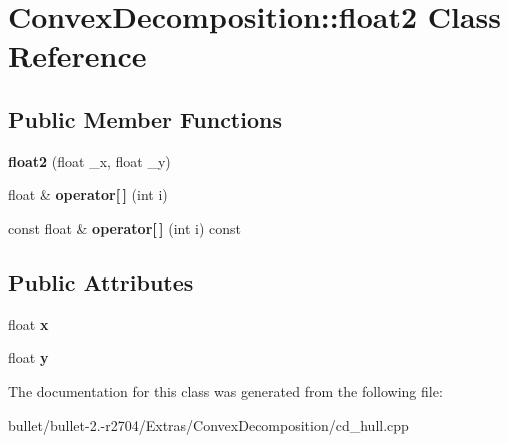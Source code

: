 \hypertarget{class_convex_decomposition_1_1float2}{\section{Convex\+Decomposition\+:\+:float2 Class Reference}
\label{class_convex_decomposition_1_1float2}
}
\subsection*{Public Member Functions}
\begin{DoxyCompactItemize}
\item 
\hypertarget{class_convex_decomposition_1_1float2_a3aa00acc282692db6dd2f2e792128a7e}{{\bfseries float2} (float \+\_\+x, float \+\_\+y)}\label{class_convex_decomposition_1_1float2_a3aa00acc282692db6dd2f2e792128a7e}

\item 
\hypertarget{class_convex_decomposition_1_1float2_a8a2a663a38f8d0798ff24c2ceda067d3}{float \& {\bfseries operator\mbox{[}$\,$\mbox{]}} (int i)}\label{class_convex_decomposition_1_1float2_a8a2a663a38f8d0798ff24c2ceda067d3}

\item 
\hypertarget{class_convex_decomposition_1_1float2_a0901c57ef39d93808e87cfff5314fcf2}{const float \& {\bfseries operator\mbox{[}$\,$\mbox{]}} (int i) const }\label{class_convex_decomposition_1_1float2_a0901c57ef39d93808e87cfff5314fcf2}

\end{DoxyCompactItemize}
\subsection*{Public Attributes}
\begin{DoxyCompactItemize}
\item 
\hypertarget{class_convex_decomposition_1_1float2_a6b88d751fa5b9f3bbbbc594ac6edfac0}{float {\bfseries x}}\label{class_convex_decomposition_1_1float2_a6b88d751fa5b9f3bbbbc594ac6edfac0}

\item 
\hypertarget{class_convex_decomposition_1_1float2_a7e1156917bcac4bed8291e4163de84ee}{float {\bfseries y}}\label{class_convex_decomposition_1_1float2_a7e1156917bcac4bed8291e4163de84ee}

\end{DoxyCompactItemize}


The documentation for this class was generated from the following file\+:\begin{DoxyCompactItemize}
\item 
bullet/bullet-\/2.-\/r2704/\+Extras/\+Convex\+Decomposition/cd\+\_\+hull.\+cpp\end{DoxyCompactItemize}
